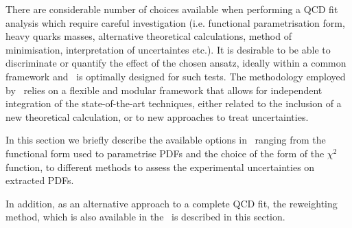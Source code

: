 



There are considerable number of choices available when performing a QCD fit analysis which require careful investigation (i.e. functional parametrisation form, heavy quarks masses, alternative theoretical calculations, method of minimisation, interpretation of uncertaintes etc.).
%
 It is desirable to be able to discriminate or quantify the effect of the chosen ansatz,  ideally within a common framework and 
\fitter\ is optimally designed for such tests.
%
The methodology employed by \fitter\  relies on a flexible and modular
framework that allows for independent integration of the state-of-the-art techniques, either related to the inclusion of a new theoretical calculation, or to new approaches to treat uncertainties. 
%

In this section we briefly describe the available options in \fitter\ ranging from the functional form used to parametrise PDFs and the choice of the form of the $\chi^2$ function, to different methods to assess the experimental uncertainties on extracted PDFs.

In addition, as an alternative approach to a complete QCD fit,  the reweighting
method, which is also available in the \fitter\, is described in this section. 



